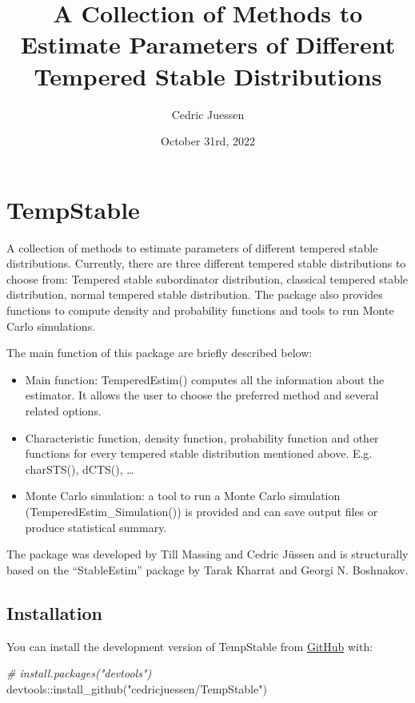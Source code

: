 \documentclass[
]{article}
\title{A Collection of Methods to Estimate Parameters of Different
Tempered Stable Distributions}
\author{Cedric Juessen}
\date{October 31rd, 2022}
\newenvironment{Shaded}{\begin{snugshade}}{\end{snugshade}}
\newcommand{\CommentTok}[1]{\textcolor[rgb]{0.56,0.35,0.01}{\textit{#1}}}
\newcommand{\FunctionTok}[1]{\textcolor[rgb]{0.00,0.00,0.00}{#1}}
\newcommand{\NormalTok}[1]{#1}
\newcommand{\SpecialCharTok}[1]{\textcolor[rgb]{0.00,0.00,0.00}{#1}}
\newcommand{\StringTok}[1]{\textcolor[rgb]{0.31,0.60,0.02}{#1}}
\providecommand{\tightlist}{%
  \setlength{\itemsep}{0pt}\setlength{\parskip}{0pt}}
\begin{document}
\maketitle

\hypertarget{tempstable}{%
\section{\texorpdfstring{TempStable }{TempStable }}\label{tempstable}}

A collection of methods to estimate parameters of different tempered
stable distributions. Currently, there are three different tempered
stable distributions to choose from: Tempered stable subordinator
distribution, classical tempered stable distribution, normal tempered
stable distribution. The package also provides functions to compute
density and probability functions and tools to run Monte Carlo simulations.

The main function of this package are briefly described below:

\begin{itemize}
\tightlist
\item
  Main function: TemperedEstim() computes all the information about the
  estimator. It allows the user to choose the preferred method and
  several related options.
\item
  Characteristic function, density function, probability function and
  other functions for every tempered stable distribution mentioned
  above. E.g. charSTS(), dCTS(), \ldots{}
\item
  Monte Carlo simulation: a tool to run a Monte Carlo simulation
  (TemperedEstim\_Simulation()) is provided and can save output files or
  produce statistical summary.
\end{itemize}

The package was developed by Till Massing and Cedric Jüssen and is
structurally based on the ``StableEstim'' package by Tarak Kharrat and
Georgi N. Boshnakov.

\hypertarget{installation}{%
\subsection{Installation}\label{installation}}

You can install the development version of TempStable from
\href{https://github.com/}{GitHub} with:

\begin{Shaded}
\begin{Highlighting}[]
\CommentTok{\# install.packages("devtools")}
\NormalTok{devtools}\SpecialCharTok{::}\FunctionTok{install\_github}\NormalTok{(}\StringTok{"cedricjuessen/TempStable"}\NormalTok{)}
\end{Highlighting}
\end{Shaded}
\end{document}
